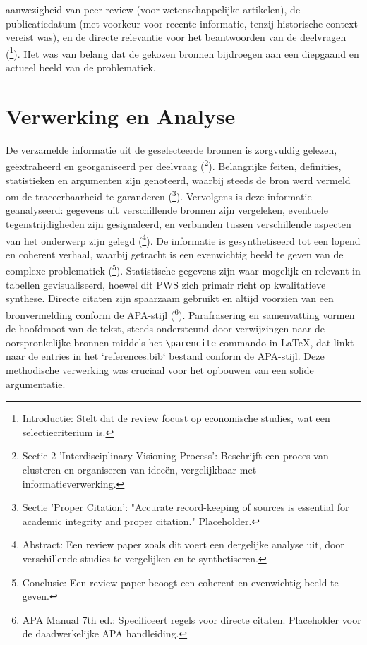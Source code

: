 \documentclass[11pt, a4paper]{report} %
\begin{document}
aanwezigheid van peer review (voor wetenschappelijke artikelen), de publicatiedatum (met voorkeur voor recente informatie, tenzij historische context vereist was), en de directe relevantie voor het beantwoorden van de deelvragen (\cite{Maclean2020EconomicStudiesOpioid}\footnote{Introductie: Stelt dat de review focust op economische studies, wat een selectiecriterium is.}). Het was van belang dat de gekozen bronnen bijdroegen aan een diepgaand en actueel beeld van de problematiek.

\section{Verwerking en Analyse}
De verzamelde informatie uit de geselecteerde bronnen is zorgvuldig gelezen, geëxtraheerd en georganiseerd per deelvraag (\cite{Yarosh2020ComputationalSupportSUD}\footnote{Sectie 2 'Interdisciplinary Visioning Process': Beschrijft een proces van clusteren en organiseren van ideeën, vergelijkbaar met informatieverwerking.}). Belangrijke feiten, definities, statistieken en argumenten zijn genoteerd, waarbij steeds de bron werd vermeld om de traceerbaarheid te garanderen (\cite{SomeAcademicIntegrityGuide}\footnote{Sectie 'Proper Citation': "Accurate record-keeping of sources is essential for academic integrity and proper citation." Placeholder.}). Vervolgens is deze informatie geanalyseerd: gegevens uit verschillende bronnen zijn vergeleken, eventuele tegenstrijdigheden zijn gesignaleerd, en verbanden tussen verschillende aspecten van het onderwerp zijn gelegd (\cite{Volkow2021ChangingOpioidCrisis}\footnote{Abstract: Een review paper zoals dit voert een dergelijke analyse uit, door verschillende studies te vergelijken en te synthetiseren.}). De informatie is gesynthetiseerd tot een lopend en coherent verhaal, waarbij getracht is een evenwichtig beeld te geven van de complexe problematiek (\cite{Maclean2020EconomicStudiesOpioid}\footnote{Conclusie: Een review paper beoogt een coherent en evenwichtig beeld te geven.}). Statistische gegevens zijn waar mogelijk en relevant in tabellen gevisualiseerd, hoewel dit PWS zich primair richt op kwalitatieve synthese. Directe citaten zijn spaarzaam gebruikt en altijd voorzien van een bronvermelding conform de APA-stijl (\cite{APAStyleManualReference}\footnote{APA Manual 7th ed.: Specificeert regels voor directe citaten. Placeholder voor de daadwerkelijke APA handleiding.}). Parafrasering en samenvatting vormen de hoofdmoot van de tekst, steeds ondersteund door verwijzingen naar de oorspronkelijke bronnen middels het \texttt{\textbackslash parencite} commando in LaTeX, dat linkt naar de entries in het `references.bib` bestand conform de APA-stijl. Deze methodische verwerking was cruciaal voor het opbouwen van een solide argumentatie.
\end{document}
